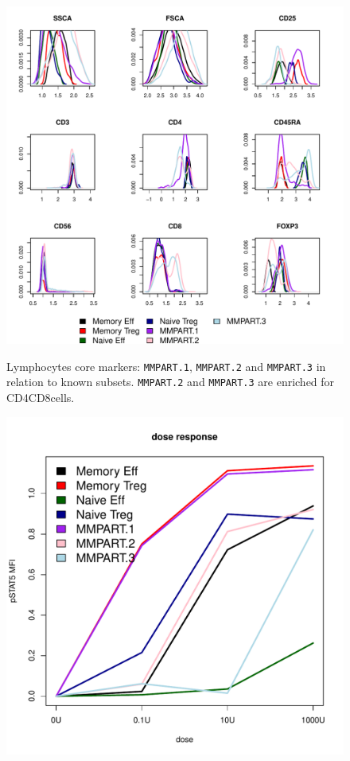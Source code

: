 %
\begin{figure}
\centering
\begin{minipage}{.9\textwidth}
\includegraphics[width=\linewidth]{figures/mmpart-lymphocytes-clusters}
\end{minipage}
{ Lymphocytes core markers: \texttt{MMPART.1}, \texttt{MMPART.2} and \texttt{MMPART.3} in relation to known subsets. }
{ \texttt{MMPART.2} and \texttt{MMPART.3} are enriched for CD4\negative CD8\positive cells.  }
%
\begin{minipage}{.5\textwidth}
  \includegraphics[width=\linewidth]{figures/mmpart-lymphocytes-dose-response}

\end{minipage}
\end{figure}
